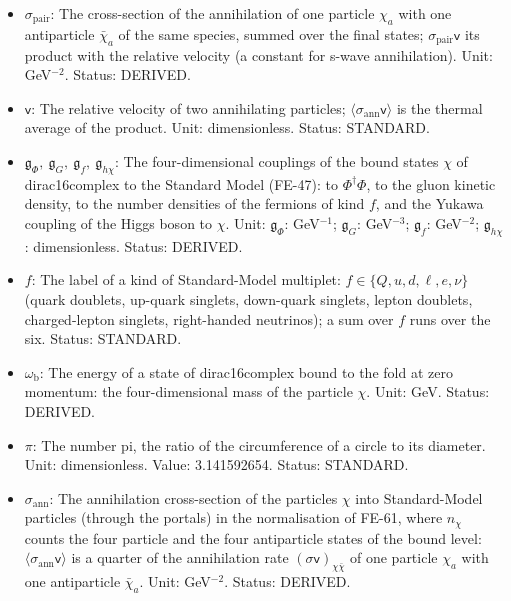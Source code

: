 \documentclass[
  10pt,
]{article}
\providecommand{\tightlist}{%
  \setlength{\itemsep}{0pt}\setlength{\parskip}{0pt}}
\begin{document}
\begin{itemize}
\tightlist
\item
  \(\sigma_{\mathrm{pair}}\): The cross-section of the annihilation of
  one particle \(\chi_a\) with one antiparticle \(\bar\chi_a\) of the
  same species, summed over the final states;
  \(\sigma_{\mathrm{pair}}\mathsf{v}\) its product with the relative
  velocity (a constant for s-wave annihilation). Unit: GeV\(^{-2}\).
  Status: DERIVED.
\item
  \(\mathsf{v}\): The relative velocity of two annihilating particles;
  \(\langle\sigma_{\mathrm{ann}}\mathsf{v}\rangle\) is the thermal
  average of the product. Unit: dimensionless. Status: STANDARD.
\item
  \(\mathfrak{g}_{\Phi},\ \mathfrak{g}_{G},\ \mathfrak{g}_{f},\ \mathfrak{g}_{h\chi}\):
  The four-dimensional couplings of the bound states \(\chi\) of
  dirac16complex to the Standard Model (FE-47): to \(\Phi^\dagger\Phi\),
  to the gluon kinetic density, to the number densities of the fermions
  of kind \(f\), and the Yukawa coupling of the Higgs boson to \(\chi\).
  Unit: \(\mathfrak{g}_{\Phi}\): GeV\(^{-1}\); \(\mathfrak{g}_{G}\):
  GeV\(^{-3}\); \(\mathfrak{g}_{f}\): GeV\(^{-2}\);
  \(\mathfrak{g}_{h\chi}\): dimensionless. Status: DERIVED.
\item
  \(f\): The label of a kind of Standard-Model multiplet:
  \(f \in \{Q, u, d, \ell, e, \nu\}\) (quark doublets, up-quark
  singlets, down-quark singlets, lepton doublets, charged-lepton
  singlets, right-handed neutrinos); a sum over \(f\) runs over the six.
  Status: STANDARD.
\item
  \(\omega_{\mathrm{b}}\): The energy of a state of dirac16complex bound
  to the fold at zero momentum: the four-dimensional mass of the
  particle \(\chi\). Unit: GeV. Status: DERIVED.
\item
  \(\pi\): The number pi, the ratio of the circumference of a circle to
  its diameter. Unit: dimensionless. Value: 3.141592654. Status:
  STANDARD.
\item
  \(\sigma_{\mathrm{ann}}\): The annihilation cross-section of the
  particles \(\chi\) into Standard-Model particles (through the portals)
  in the normalisation of FE-61, where \(n_\chi\) counts the four
  particle and the four antiparticle states of the bound level:
  \(\langle\sigma_{\mathrm{ann}}\mathsf{v}\rangle\) is a quarter of the
  annihilation rate \((\sigma\mathsf{v})_{\chi\bar\chi}\) of one
  particle \(\chi_a\) with one antiparticle \(\bar\chi_a\). Unit:
  GeV\(^{-2}\). Status: DERIVED.

\end{itemize}
\end{document}
